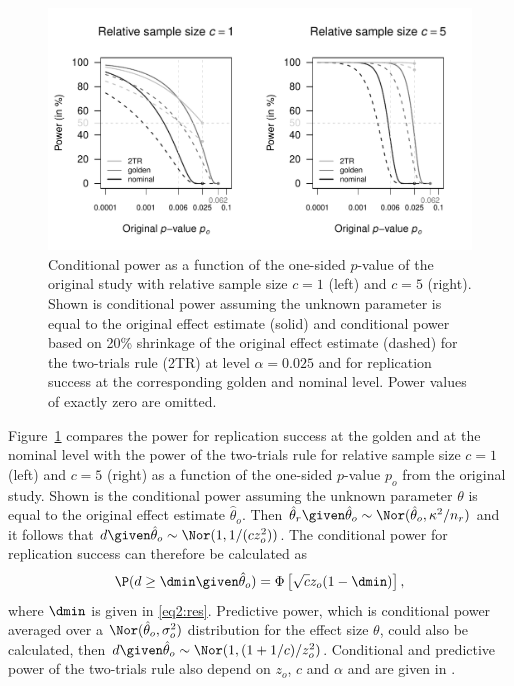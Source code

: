 \begin{figure}[!ht]
\begin{center}
\begin{knitrout}
\color{fgcolor}

{\centering \includegraphics[width=\maxwidth]{images/paper2/fig3-1}

}

\end{knitrout}
\end{center}
\caption{Conditional power as a function of the {one-sided} $p$-value of the
  original study with relative sample size $c=1$ (left) and $c=5$ (right). Shown
  is conditional power assuming the unknown parameter is equal to the original
  effect estimate (solid) and conditional power based on 20\% shrinkage of the
  original effect estimate (dashed) for the two-trials rule (2TR) at level
  $\alpha = 0.025$ and for replication success at the corresponding golden and
  nominal level. Power values of exactly zero are omitted.}
\label{fig2:fig3}
\end{figure}

Figure~\ref{fig2:fig3} compares the power for replication success
\citep[see][Section 4 for details]{Held2020} at the golden and at the nominal
level with the power of the two-trials rule for relative sample size $c = 1$
(left) and $c = 5$ (right) as a function of the one-sided $p$-value $p_o$ from
the original study. Shown is the conditional power assuming the unknown
parameter $\theta$ is equal to the original effect estimate $\hat \theta_o$.
Then $\hat \theta_r \given \hat \theta_o \sim \Nor(\hat \theta_o, \kappa^2/n_r)$
and it follows that $d \given \hat \theta_o \sim \Nor(1, 1/(c z_o^2))$. The
conditional power for replication success can therefore be calculated as
\begin{equation}\label{eq2:condPower}
\P(d \geq \dmin \given \hat \theta_o) = \Phi\left[\sqrt{c} z_o (1-\dmin)\right],
\end{equation}
where $\dmin$ is given in \eqref{eq2:res}. Predictive power, which is conditional
power averaged over a $\Nor(\hat \theta_o, \sigma_o^2)$ distribution for the
effect size $\theta$, could also be calculated, then
\mbox{$d \given \hat \theta_o \sim \Nor(1, (1+1/c)/z_o^2)$}. Conditional and
predictive power of the two-trials rule also depend on $z_o$, $c$ and $\alpha$
and are given in \citet{Micheloud2020}.

